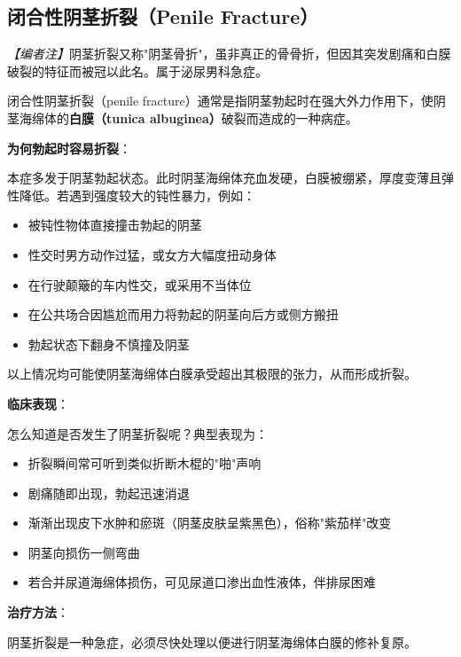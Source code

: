 \subsection{闭合性阴茎折裂（Penile Fracture）}

\noindent\textit{【编者注】}阴茎折裂又称"阴茎骨折"，虽非真正的骨骨折，但因其突发剧痛和白膜破裂的特征而被冠以此名。属于泌尿男科急症。

\vspace{0.5em}
闭合性阴茎折裂（penile fracture）通常是指阴茎勃起时在强大外力作用下，使阴茎海绵体的\textbf{白膜（tunica albuginea）}破裂而造成的一种病症。

\vspace{0.5em}
\noindent\textbf{为何勃起时容易折裂}：

本症多发于阴茎勃起状态。此时阴茎海绵体充血发硬，白膜被绷紧，厚度变薄且弹性降低。若遇到强度较大的钝性暴力，例如：
\begin{itemize}
	\item 被钝性物体直接撞击勃起的阴茎
	\item 性交时男方动作过猛，或女方大幅度扭动身体
	\item 在行驶颠簸的车内性交，或采用不当体位
	\item 在公共场合因尴尬而用力将勃起的阴茎向后方或侧方搬扭
	\item 勃起状态下翻身不慎撞及阴茎
\end{itemize}
以上情况均可能使阴茎海绵体白膜承受超出其极限的张力，从而形成折裂。

\vspace{0.5em}
\noindent\textbf{临床表现}：

怎么知道是否发生了阴茎折裂呢？典型表现为：
\begin{itemize}
	\item 折裂瞬间常可听到类似折断木棍的"啪"声响
	\item 剧痛随即出现，勃起迅速消退
	\item 渐渐出现皮下水肿和瘀斑（阴茎皮肤呈紫黑色），俗称"紫茄样"改变
	\item 阴茎向损伤一侧弯曲
	\item 若合并尿道海绵体损伤，可见尿道口渗出血性液体，伴排尿困难
\end{itemize}

\vspace{0.5em}
\noindent\textbf{治疗方法}：

阴茎折裂是一种急症，必须尽快处理以便进行阴茎海绵体白膜的修补复原。

